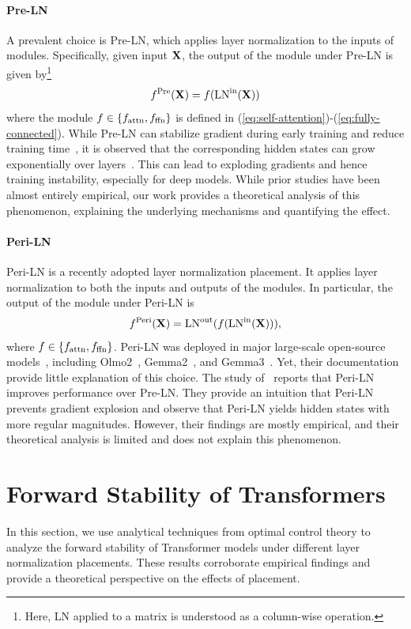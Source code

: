 \documentclass[journal]{IEEEtran}
\newcommand{\bfX}{{\bf X}}
\theoremstyle{plain}
\theoremstyle{definition}
\theoremstyle{remark}
\begin{document}
\paragraph{Pre-LN}
A prevalent choice is Pre-LN, which applies layer normalization to the inputs of modules. Specifically, given input $\bfX$, the output of the module under Pre-LN is given by\footnote{Here, LN applied to a matrix is understood as a column-wise operation.}
\begin{equation}\label{eq:Pre-LN}
    f^{\rm Pre}(\bfX) = f( {\rm LN}^{\rm in}(\bfX))
\end{equation}
where the module $f \in \{ f_{\rm attn}, f_{\rm ffn}\}$ is defined in (\ref{eq:self-attention})-(\ref{eq:fully-connected}). 
While Pre-LN can stabilize gradient during early training and reduce training time~\cite{xiong2020layer}, it is observed that the corresponding hidden states can grow exponentially over layers~\cite{sun2024massive,kim2025peri}. This can lead to exploding gradients and hence training instability, especially for deep models. While prior studies have been almost entirely empirical, our work provides a theoretical analysis of this phenomenon, explaining the underlying mechanisms and quantifying the effect.

\paragraph{Peri-LN}
Peri-LN is a recently adopted layer normalization placement. It applies layer normalization to both the inputs and outputs of the modules. In particular, the output of the module under Peri-LN is
\begin{equation}\label{eq:Peri-LN}
    f^{\rm Peri}(\bfX) = {\rm LN}^{\rm out} ( f( {\rm LN}^{\rm in}(\bfX)) ),
\end{equation}
where $f \in \{ f_{\rm attn}, f_{\rm ffn}\}$.
Peri-LN was deployed in major large-scale open-source models~\cite{kim2025peri}, including Olmo2~\cite{OLMo2}, Gemma2~\cite{Gemma2}, and Gemma3~\cite{team2025gemma}. Yet, their documentation provide little explanation of this choice. The study of~\cite{kim2025peri} reports that Peri-LN improves performance over Pre-LN. They provide an intuition that Peri-LN prevents gradient explosion and observe that Peri-LN yields hidden states with more regular magnitudes. However, their findings are mostly empirical, and their theoretical analysis is limited and does not explain this phenomenon. 

\section{Forward Stability of Transformers}\label{sec:forward}
In this section, we use analytical techniques from optimal control theory%
 to analyze the forward stability of Transformer models under different layer normalization placements. These results corroborate empirical findings and provide a theoretical perspective on the effects of placement.
\end{document}
